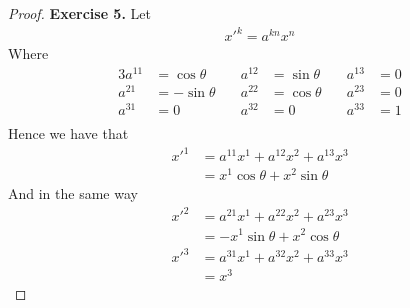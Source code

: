 \documentclass[11pt]{article}
\theoremstyle{definition}
\begin{document}
\begin{proof}{\textbf{Exercise 5.}}
    Let
    \begin{align*}
        x'^k = a^{kn} x^n
    \end{align*}
    Where
    \begin{alignat*}{3}
        a^{11} &= \cos\theta &\quad a^{12} &= \sin\theta &\quad a^{13} &= 0\\
        a^{21} &= -\sin\theta &\quad a^{22} &= \cos\theta &\quad a^{23} &= 0\\
        a^{31} &= 0 &\quad a^{32} &= 0 &\quad a^{33} &= 1\\
    \end{alignat*}
    Hence we have that
    \begin{align*}
        x'^1 &= a^{11}x^1 + a^{12}x^2 + a^{13}x^3\\
            &= x^1 \cos\theta + x^2\sin\theta 
    \end{align*}
    And in the same way
    \begin{align*}
        x'^2 &= a^{21}x^1 + a^{22}x^2 + a^{23}x^3\\
            &= -x^1 \sin\theta + x^2\cos\theta\\
        x'^3 &= a^{31}x^1 + a^{32}x^2 + a^{33}x^3\\
            &= x^3            
    \end{align*}
\end{proof}
\cleardoublepage
\end{document}
